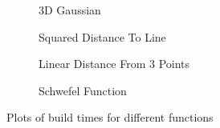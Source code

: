 \begin{figure}
    \centering
    \begin{subfigure}[b]{0.5\textwidth}
        \resizebox{1.0\textwidth}{!}{}
        \caption{3D Gaussian}
        \label{fig:build_time_0}
    \end{subfigure}\hfill
    \begin{subfigure}[b]{0.5\textwidth}
        \resizebox{1.0\textwidth}{!}{}
        \caption{Squared Distance To Line}
        \label{fig:build_time_1}
    \end{subfigure}
    \begin{subfigure}[b]{0.5\textwidth}
        \resizebox{1.0\textwidth}{!}{}
        \caption{Linear Distance From 3 Points}
        \label{fig:build_time_2}
    \end{subfigure}\hfill
    \begin{subfigure}[b]{0.5\textwidth}
        \resizebox{1.0\textwidth}{!}{}
        \caption{Schwefel Function}
        \label{fig:build_time_3}
    \end{subfigure}
    \caption{Plots of build times for different functions}
    \label{fig:build_time}
\end{figure}

\printindex


